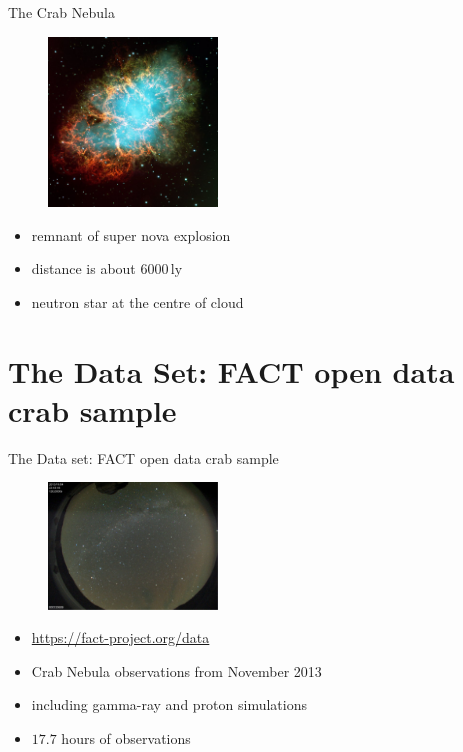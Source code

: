 \begin{frame}[t]{The Crab Nebula}
  \begin{multicols}{2}
    \begin{figure}
        \centering
        \includegraphics[width=0.4\textwidth]{fig/crab.jpg}
    \end{figure}
    \columnbreak
    \vspace*{\fill}
    \begin{itemize}
        \item remnant of super nova explosion
        \item distance is about $6000\,\text{ly}$
        \item neutron star at the centre of cloud
    \end{itemize}
    \vspace*{\fill}
  \end{multicols}
\end{frame}

\section{The Data Set: FACT open data crab sample}

\begin{frame}[t]{The Data set: FACT open data crab sample}
    \begin{multicols}{2}
        \begin{figure}
            \centering
            \includegraphics[width=0.4\textwidth]{fig/cond.png}
        \end{figure}
    \columnbreak
    \vspace*{\fill}
        \begin{itemize}
            \item \url{https://fact-project.org/data}
            \item Crab Nebula observations from November 2013
            \item including gamma-ray and proton simulations
            \item $17.7$ hours of observations
        \end{itemize}
    \vspace*{\fill}
  \end{multicols}
\end{frame}

